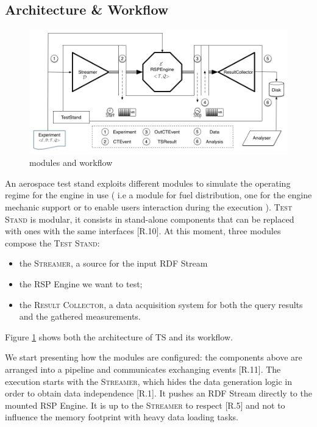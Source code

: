 \subsection{Architecture \& Workflow}

\begin{figure}[tbh]
\centering
\includegraphics[scale=0.37]{images/schema2}
\caption{\name modules and workflow} 
\label{fig:architecture}
\end{figure}

\noindent An aerospace test stand exploits different modules to simulate the operating regime for the engine in use ( i.e a module for fuel distribution, one for the engine mechanic support or to enable users interaction during the execution ). \name \textsc{Test Stand}  is modular, it consists in stand-alone components that can be replaced with ones with the same interfaces [R.10]. At this moment, three modules compose the \textsc{Test Stand}:
\begin{itemize}
\item the \textsc{Streamer}, a source for the input RDF Stream
\item the RSP Engine we want to test;
\item the \textsc{Result Collector}, a data acquisition system for both the query results and the gathered measurements.
\end{itemize}
Figure \ref{fig:architecture} shows both the architecture of \name TS and its workflow.

We start presenting how the modules are configured: the components above are arranged into a pipeline and communicates exchanging events [R.11].  The execution starts with the \textsc{Streamer}, which hides the data generation logic in order to obtain data independence [R.1]. It pushes an RDF Stream directly to the mounted RSP Engine. It is up to the \textsc{Streamer} to respect [R.5] and not to influence the memory footprint with heavy data loading tasks. 

